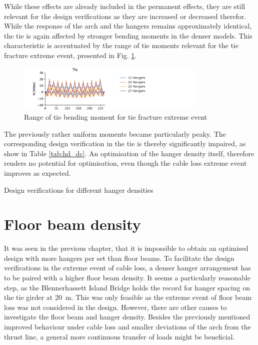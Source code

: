 While these effects are already included in the permanent effects, they are still relevant for the design verifications as they are increased or decreased therefor. While the response of the arch and the hangers remains approximately identical, the tie is again affected by stronger bending moments in the denser models. This characteristic is accentuated by the range of tie moments relevant for the tie fracture extreme event, presented in Fig. \ref{fig:hd_tie_fracture}.

\begin{figure}[H]
    \centering
    \includegraphics[trim={0 0 3cm 0},clip, width=0.8\textwidth]{calculations/hanger amount comparison/tie fracture.png}
    \caption{Range of tie bending moment for tie fracture extreme event}
    \label{fig:hd_tie_fracture}
\end{figure}

The previously rather uniform moments became particularly peaky. The corresponding design verification in the tie is thereby significantly impaired, as show in Table \ref{tab:hd_dc}. An optimisation of the hanger density itself, therefore renders no potential for optimisation, even though the cable loss extreme event improves as expected.

\begin{table}[H]
    \centering
    \caption{Design verifications for different hanger densities}
    \label{tab:hd_dc}
    \resizebox{0.85\columnwidth}{!}{%
    
    }
\end{table}


\section{Floor beam density}
It was seen in the previous chapter, that it is impossible to obtain an optimised design with more hangers per set than floor beams. To facilitate the design verifications in the extreme event of cable loss, a denser hanger arrangement has to be paired with a higher floor beam density. It seems a particularly reasonable step, as the Blennerhassett Island Bridge holds the record for hanger spacing on the tie girder at \SI{20}{m}. This was only feasible as the extreme event of floor beam loss was not considered in the design. However, there are other causes to investigate the floor beam and hanger density. Besides the previously mentioned improved behaviour under cable loss and smaller deviations of the arch from the thrust line, a general more continuous transfer of loads might be beneficial. \medskip

